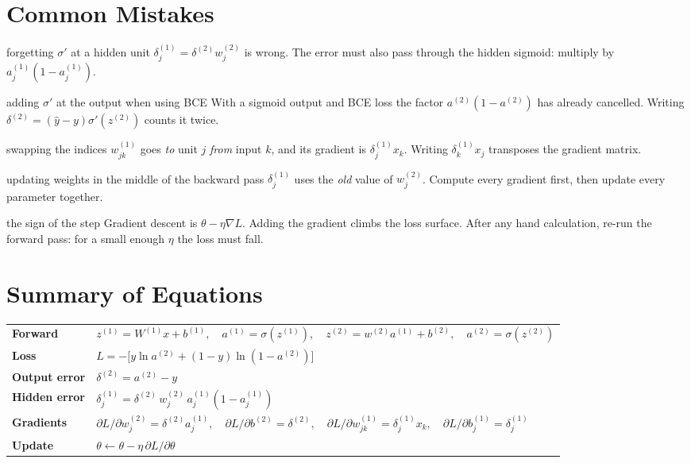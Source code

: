\documentclass[11pt]{article}
\begin{document}
\section{Common Mistakes}
\begin{pitfall}{forgetting $\sigma'$ at a hidden unit}
$\delta^{(1)}_j=\delta^{(2)}w^{(2)}_j$ is wrong. The error must also pass through the hidden sigmoid: multiply by $a^{(1)}_j(1-a^{(1)}_j)$.
\end{pitfall}
\begin{pitfall}{adding $\sigma'$ at the output when using BCE}
With a sigmoid output and BCE loss the factor $a^{(2)}(1-a^{(2)})$ has already cancelled. Writing $\delta^{(2)}=(\hat y-y)\sigma'(z^{(2)})$ counts it twice.
\end{pitfall}
\begin{pitfall}{swapping the indices}
$w^{(1)}_{jk}$ goes \emph{to} unit $j$ \emph{from} input $k$, and its gradient is $\delta^{(1)}_j x_k$. Writing $\delta^{(1)}_k x_j$ transposes the gradient matrix.
\end{pitfall}
\begin{pitfall}{updating weights in the middle of the backward pass}
$\delta^{(1)}_j$ uses the \emph{old} value of $w^{(2)}_j$. Compute every gradient first, then update every parameter together.
\end{pitfall}
\begin{pitfall}{the sign of the step}
Gradient descent is $\theta-\eta\nabla L$. Adding the gradient climbs the loss surface. After any hand calculation, re-run the forward pass: for a small enough $\eta$ the loss must fall.
\end{pitfall}

\section{Summary of Equations}
\begin{center}\small\renewcommand{\arraystretch}{1.6}
\begin{tabular}{ll}
\toprule
\textbf{Forward} & $z^{(1)}=W^{(1)}x+b^{(1)},\quad a^{(1)}=\sigma(z^{(1)}),\quad z^{(2)}=w^{(2)}a^{(1)}+b^{(2)},\quad a^{(2)}=\sigma(z^{(2)})$\\
\textbf{Loss} & $L=-\bigl[y\ln a^{(2)}+(1-y)\ln(1-a^{(2)})\bigr]$\\
\textbf{Output error} & $\delta^{(2)}=a^{(2)}-y$\\
\textbf{Hidden error} & $\delta^{(1)}_j=\delta^{(2)}\,w^{(2)}_j\,a^{(1)}_j(1-a^{(1)}_j)$\\
\textbf{Gradients} & $\partial L/\partial w^{(2)}_j=\delta^{(2)}a^{(1)}_j,\quad \partial L/\partial b^{(2)}=\delta^{(2)},\quad \partial L/\partial w^{(1)}_{jk}=\delta^{(1)}_jx_k,\quad \partial L/\partial b^{(1)}_j=\delta^{(1)}_j$\\
\textbf{Update} & $\theta\leftarrow\theta-\eta\,\partial L/\partial\theta$\\
\bottomrule
\end{tabular}
\end{center}
\end{document}
